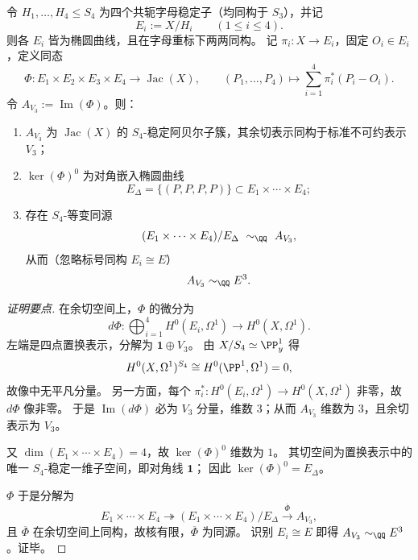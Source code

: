 \begin{conclusion}\label{con:xi-terminal-zm-standard-factor-geometric-realization-e-cube}
令 \(H_1,\dots,H_4\le S_4\) 为四个共轭字母稳定子（均同构于 \(S_3\)），并记
\[
E_i:=X/H_i\qquad(1\le i\le4).
\]
则各 \(E_i\) 皆为椭圆曲线，且在字母重标下两两同构。
记 \(\pi_i:X\to E_i\)，固定 \(O_i\in E_i\)，定义同态
\[
\Phi:E_1\times E_2\times E_3\times E_4\longrightarrow \operatorname{Jac}(X),\qquad
(P_1,\dots,P_4)\longmapsto \sum_{i=1}^4 \pi_i^*(P_i-O_i).
\]
令 \(A_{V_3}:=\operatorname{Im}(\Phi)\)。则：
\begin{enumerate}
  \item \(A_{V_3}\) 为 \(\operatorname{Jac}(X)\) 的 \(S_4\)-稳定阿贝尔子簇，其余切表示同构于标准不可约表示 \(V_3\)；
  \item \(\ker(\Phi)^0\) 为对角嵌入椭圆曲线
  \[
  E_\Delta=\{(P,P,P,P)\}\subset E_1\times\cdots\times E_4;
  \]
  \item 存在 \(S_4\)-等变同源
  \[
  (E_1\times\cdots\times E_4)/E_\Delta\ \sim_{\QQ}\ A_{V_3},
  \]
  从而（忽略标号同构 \(E_i\cong E\)）
  \[
  A_{V_3}\sim_{\QQ}E^3.
  \]
\end{enumerate}
\end{conclusion}
\begin{proof}[证明要点]
在余切空间上，\(\Phi\) 的微分为
\[
d\Phi:\bigoplus_{i=1}^4 H^0(E_i,\Omega^1)\longrightarrow H^0(X,\Omega^1).
\]
左端是四点置换表示，分解为 \(\mathbf 1\oplus V_3\)。
由 \(X/S_4\simeq \PP^1_y\) 得
\[
H^0(X,\Omega^1)^{S_4}\cong H^0(\PP^1,\Omega^1)=0,
\]
故像中无平凡分量。
另一方面，每个 \(\pi_i^*:H^0(E_i,\Omega^1)\to H^0(X,\Omega^1)\) 非零，故 \(d\Phi\) 像非零。
于是 \(\operatorname{Im}(d\Phi)\) 必为 \(V_3\) 分量，维数 \(3\)；从而 \(A_{V_3}\) 维数为 \(3\)，且余切表示为 \(V_3\)。

又 \(\dim(E_1\times\cdots\times E_4)=4\)，故 \(\ker(\Phi)^0\) 维数为 \(1\)。
其切空间为置换表示中的唯一 \(S_4\)-稳定一维子空间，即对角线 \(\mathbf 1\)；
因此 \(\ker(\Phi)^0=E_\Delta\)。

\(\Phi\) 于是分解为
\[
E_1\times\cdots\times E_4 \twoheadrightarrow (E_1\times\cdots\times E_4)/E_\Delta
\xrightarrow{\ \overline{\Phi}\ } A_{V_3},
\]
且 \(\overline{\Phi}\) 在余切空间上同构，故核有限，\(\overline{\Phi}\) 为同源。
识别 \(E_i\cong E\) 即得 \(A_{V_3}\sim_{\QQ}E^3\)。证毕。
\end{proof}


